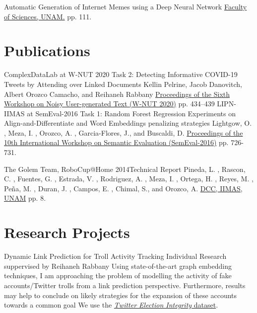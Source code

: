 \documentclass[8pt,a4paper,sans]{moderncv} %
\begin{document}
        {Automatic Generation of Internet Memes using a Deep Neural Network}
        {}{}{}
        {\href{http://132.248.9.195/ptd2018/febrero/0770173/}{Faculty of Sciences, UNAM.} pp. 111.}

\newpage

\section{Publications}

        {ComplexDataLab at W-NUT 2020 Task 2: Detecting Informative COVID-19 Tweets by Attending over Linked Documents}
        {}{}{}
        {Kellin Pelrine, Jacob Danovitch, Albert Orozco Camacho, and Reihaneh Rabbany
         \href{https://www.aclweb.org/anthology/2020.wnut-1.63}{Proceedings of the Sixth Workshop on Noisy User-generated Text (W-NUT 2020)} pp. 434–439}
        {LIPN-IIMAS at SemEval-2016 Task 1: Random Forest Regression Experiments on Align-and-Differentiate and Word Embeddings penalizing strategies}
        {}{}{}
        {Lightgow, O. , Meza, I. , Orozco, A. , Garcia-Flores, J., and Buscaldi, D.
         \href{https://www.aclweb.org/anthology/S/S16/S16-1112.pdf}{Proceedings of the 10th International Workshop on Semantic Evaluation (SemEval-2016)} pp. 726-731.}

        {The Golem Team, RoboCup@Home 2014}{Technical Report}
        {}{}
        {Pineda, L. , Rascon, C. , Fuentes, G. , Estrada, V. , Rodriguez, A. , Meza, I. , Ortega, H. ,
         Reyes, M. , Peña, M. , Duran, J. , Campos, E. , Chimal, S., and Orozco, A.
         \href{http://golem.iimas.unam.mx/pubs/tdp_Golem-II+_2014.pdf}{DCC, IIMAS, UNAM} pp. 8.}

\section{Research Projects}


        {Dynamic Link Prediction for Troll Activity Tracking}
        {Individual Research}
        {suppervised by Reihaneh Rabbany}
        {Using state-of-the-art graph embedding techniques, I am approaching the problem
          of modelling the activity of fake accounts/Twitter trolls from a link prediction
          perspective. Furthermore, results may help to conclude on likely strategies for
          the expansion of these accounts towards a common goal}
        {We use the \href{https://transparency.twitter.com/en/reports/information-operations.html}{\emph{Twitter Election Integrity} dataset}.}
        
\end{document}
